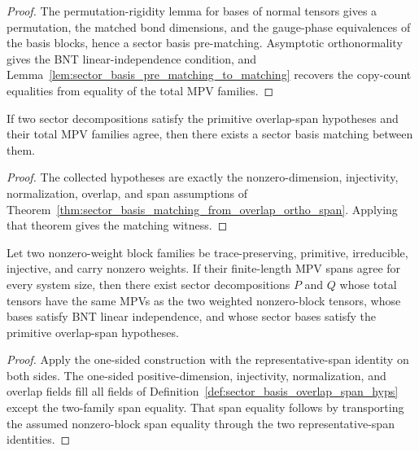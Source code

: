 \begin{proof}
	\leanok
	The permutation-rigidity lemma for bases of normal tensors gives a
	permutation, the matched bond dimensions, and the gauge-phase equivalences
	of the basis blocks, hence a sector basis pre-matching. Asymptotic
	orthonormality gives the BNT linear-independence condition, and
	Lemma~\ref{lem:sector_basis_pre_matching_to_matching} recovers the
	copy-count equalities from equality of the total MPV families.
\end{proof}

\begin{lemma}%
\label{lem:sector_basis_overlap_span_to_matching}
	\leanok
	If two sector decompositions satisfy the primitive overlap-span hypotheses
	and their total MPV families agree, then there exists a sector basis matching
	between them.
\end{lemma}

\begin{proof}
	\leanok
	The collected hypotheses are exactly the nonzero-dimension, injectivity,
	normalization, overlap, and span assumptions of
	Theorem~\ref{thm:sector_basis_matching_from_overlap_ortho_span}. Applying
	that theorem gives the matching witness.
\end{proof}


\begin{theorem}%
\label{thm:bnt_sector_decomp_pair_overlap_span_of_block_span}
	\leanok
	Let two nonzero-weight block families be trace-preserving, primitive, irreducible,
	injective, and carry nonzero weights. If their finite-length MPV spans agree
	for every system size, then there exist sector decompositions $P$ and $Q$
	whose total tensors have the same MPVs as the two weighted nonzero-block tensors,
	whose bases satisfy BNT linear independence, and whose sector bases satisfy
	the primitive overlap-span hypotheses.
\end{theorem}

\begin{proof}
	\leanok
	Apply the one-sided construction with the representative-span identity on both
	sides. The one-sided positive-dimension, injectivity, normalization, and
	overlap fields fill all fields of
	Definition~\ref{def:sector_basis_overlap_span_hyps} except the two-family
	span equality. That span equality follows by transporting the assumed
	nonzero-block span equality through the two representative-span identities.
\end{proof}

